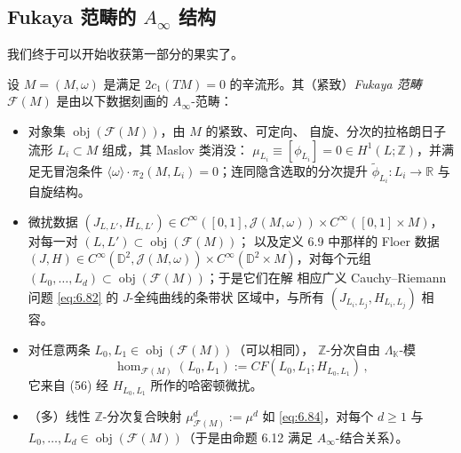 \subsection{Fukaya 范畴的 $A_\infty$ 结构}\label{sec:6.3}

我们终于可以开始收获第一部分的果实了。

\begin{Def}\label{def:6.13}
设 $M=(M,\omega)$ 是满足 $2c_1(TM)=0$ 的辛流形。其（紧致）\emph{Fukaya 范畴}
$\mathcal F(M)$ 是由以下数据刻画的 $A_\infty$-范畴：
\begin{itemize}
  \item 对象集 $\operatorname{obj}(\mathcal F(M))$，由 $M$ 的紧致、可定向、
  自旋、分次的拉格朗日子流形 $L_i\subset M$ 组成，其 Maslov 类消没：
  $\mu_{L_i}\equiv[\phi_{L_i}]=0\in H^1(L;\mathbb Z)$，并满足无冒泡条件
  $\langle\omega\rangle\cdot\pi_2(M,L_i)=0$；连同隐含选取的分次提升
  $\tilde\phi_{L_i}:L_i\to\mathbb R$ 与自旋结构。
  \item 微扰数据
  $(J_{L,L'},H_{L,L'})\in C^\infty([0,1],\mathcal J(M,\omega))\times
  C^\infty([0,1]\times M)$，对每一对 $(L,L')\subset\operatorname{obj}(\mathcal F(M))$；
  以及定义 6.9 中那样的 Floer 数据
  $(J,H)\in C^\infty(\mathbb D^2,\mathcal J(M,\omega))\times
  C^\infty(\mathbb D^2\times M)$，对每个元组
  $(L_0,\dots,L_d)\subset\operatorname{obj}(\mathcal F(M))$；于是它们在解
  相应广义 Cauchy--Riemann 问题 \eqref{eq:6.82} 的 $J$-全纯曲线的条带状
  区域中，与所有 $(J_{L_i,L_j},H_{L_i,L_j})$ 相容。
  \item 对任意两条 $L_0,L_1\in\operatorname{obj}(\mathcal F(M))$（可以相同），
  $\mathbb Z$-分次自由 $\Lambda_{\mathbb K}$-模
  \begin{equation}
  \hom_{\mathcal F(M)}(L_0,L_1):=CF(L_0,L_1;H_{L_0,L_1})\,,
  \label{eq:6.86}
  \end{equation}
  它来自 (56) 经 $H_{L_0,L_1}$ 所作的哈密顿微扰。
  \item （多）线性 $\mathbb Z$-分次复合映射
  $\mu^d_{\mathcal F(M)}:=\mu^d$ 如 \eqref{eq:6.84}，对每个 $d\ge 1$ 与
  $L_0,\dots,L_d\in\operatorname{obj}(\mathcal F(M))$（于是由命题 6.12 满足
  $A_\infty$-结合关系）。
\end{itemize}
\end{Def}

